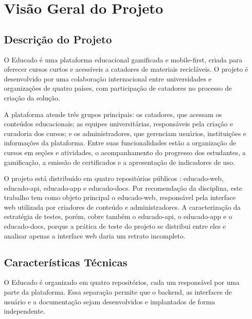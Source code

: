 \section{Visão Geral do Projeto}

\subsection{Descrição do Projeto}

O Educado é uma plataforma educacional gamificada e mobile-first, criada para oferecer cursos curtos e acessíveis a catadores de materiais recicláveis.
O projeto é desenvolvido por uma colaboração internacional entre universidades e organizações de quatro países, com participação de catadores no processo de criação da solução.

A plataforma atende três grupos principais: os catadores, que acessam os conteúdos educacionais; as equipes universitárias, responsáveis pela criação e curadoria dos cursos; e os administradores, que gerenciam usuários, instituições e informações da plataforma.
Entre suas funcionalidades estão a organização de cursos em seções e atividades, o acompanhamento do progresso dos estudantes, a gamificação, a emissão de certificados e a apresentação de indicadores de uso.

O projeto está distribuído em quatro repositórios públicos \cite{educado-repos}: educado-web, educado-api, educado-app e educado-docs.
Por recomendação da disciplina, este trabalho tem como objeto principal o educado-web, responsável pela interface web utilizada por criadores de conteúdo e administradores.
A caracterização da estratégia de testes, porém, cobre também o educado-api, o educado-app e o educado-docs, porque a prática de teste do projeto se distribui entre eles e analisar apenas a interface web daria um retrato incompleto.

\subsection{Características Técnicas}

O Educado é organizado em quatro repositórios, cada um responsável por uma parte da plataforma.
Essa separação permite que o backend, as interfaces de usuário e a documentação sejam desenvolvidos e implantados de forma independente.

